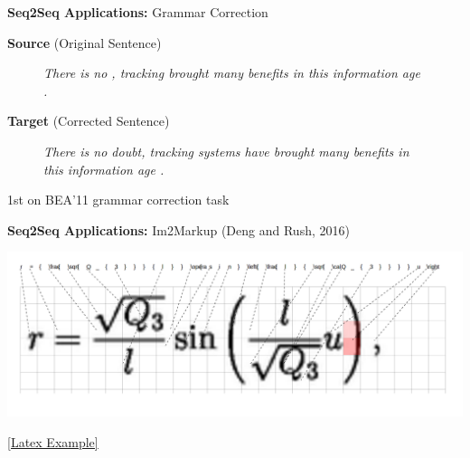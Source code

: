 \documentclass{beamer}
\let\tempone\itemize
\let\temptwo\enditemize
\renewenvironment{itemize}{\tempone\addtolength{\itemsep}{0.5\baselineskip}}{\temptwo}
\newcommand{\air}{\vspace{0.25cm}}
\newcommand{\mair}{\vspace{-0.25cm}}
\newcommand{\Cite}[1]{{\footnotesize \citep{#1}}}
\begin{document}
\begin{frame}
  \centerline{\textbf{Seq2Seq Applications:} \alert{Grammar Correction} \Cite{Schmaltz2016} }
  
  \begin{center}
    \textbf{Source} (Original Sentence)
  \end{center}
  
  \begin{figure}
    \textit{There is no , tracking  brought many benefits in this information
age . }
  \end{figure}

  \begin{center}
    \textbf{Target} (Corrected Sentence)
  \end{center}
  \mair

  \begin{figure}
    \centering
    \textit{There is no doubt, tracking systems have
      brought many benefits in this information
      age . }
  \end{figure}

  \begin{itemize}
  \item 1st on BEA'11 grammar correction task \Cite{Daudaravicius2016}
  \end{itemize}
\end{frame}


\begin{frame}
  \centerline{\textbf{Seq2Seq Applications:} \alert{Im2Markup} (Deng and Rush, 2016) }
  
  \air 

  \begin{center}
    \includegraphics[width=\textwidth]{math}
  \end{center}
  


  \begin{figure}
    \centering
  \end{figure}
  \centerline{\href{https://harvardnlp.github.io/seq2seq-talk/web/math.html}{[Latex Example]}}
\end{frame}
\end{document}
